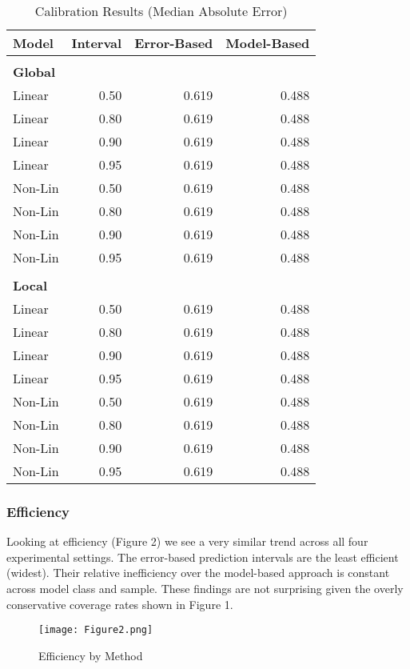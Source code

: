 \documentclass[colTwo]{anon}
\theoremstyle{definition}
\begin{document}
\begin{table}[h]
\centering
{\color{red}
\begin{tabular}{l|r|r|r}
\hline
\textbf{Model} & \textbf{Interval} & \textbf{Error-Based} & \textbf{Model-Based}\\
\hline
& & & \\
\textbf{Global} & & & \\
\hline
Linear & 0.50 & 0.619 & 0.488 \\
Linear & 0.80 & 0.619 & 0.488 \\
Linear & 0.90 & 0.619 & 0.488 \\
Linear & 0.95 & 0.619 & 0.488 \\
\hline
Non-Lin & 0.50 & 0.619 & 0.488 \\
Non-Lin & 0.80 & 0.619 & 0.488 \\
Non-Lin & 0.90 & 0.619 & 0.488 \\
Non-Lin & 0.95 & 0.619 & 0.488 \\
\hline
& & & \\
\textbf{Local} & & & \\
\hline
Linear & 0.50 & 0.619 & 0.488 \\
Linear & 0.80 & 0.619 & 0.488 \\
Linear & 0.90 & 0.619 & 0.488 \\
Linear & 0.95 & 0.619 & 0.488 \\
\hline
Non-Lin & 0.50 & 0.619 & 0.488 \\
Non-Lin & 0.80 & 0.619 & 0.488 \\
Non-Lin & 0.90 & 0.619 & 0.488 \\
Non-Lin & 0.95 & 0.619 & 0.488 \\
\hline
\hline
\end{tabular}
}
\caption{Calibration Results (Median Absolute Error)}
\label{table:5}
\end{table}

\subsubsection{Efficiency}

Looking at efficiency (Figure 2) we see a very similar trend across all four experimental settings.  The error-based prediction intervals are the least efficient (widest). Their relative inefficiency over the model-based approach is constant across model class and sample. These findings are not surprising given the overly conservative coverage rates shown in Figure 1. 

\begin{figure}[h!]
\centering
\texttt{[image: Figure2.png]}
\caption{Efficiency by Method}
\label{fig:effm}
\end{figure}
\end{document}
